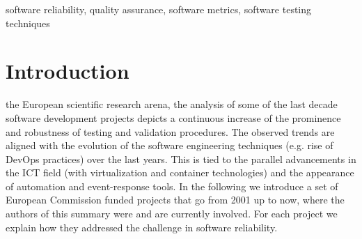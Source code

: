 \documentclass[journal]{IEEEtran}
\begin{document}
\begin{IEEEkeywords}
software reliability, quality assurance, software metrics, software testing
techniques
\end{IEEEkeywords}






%
\IEEEpeerreviewmaketitle



\section{Introduction}
%
%
%
%
 the European scientific research arena, the analysis of
some of the last decade software development projects depicts a continuous
increase of the prominence and robustness of testing and validation procedures.
The observed trends are aligned with the evolution of the software engineering
techniques (e.g. rise of DevOps practices) over the last years. This is tied to
the parallel advancements in the ICT field (with virtualization and container
technologies) and the appearance of automation and event-response tools. In the
following we introduce a set of European Commission funded projects that go
from 2001 up to now, where the authors of this summary were and are currently
involved. For each project we explain how they addressed the challenge in
software reliability.
\end{document}
